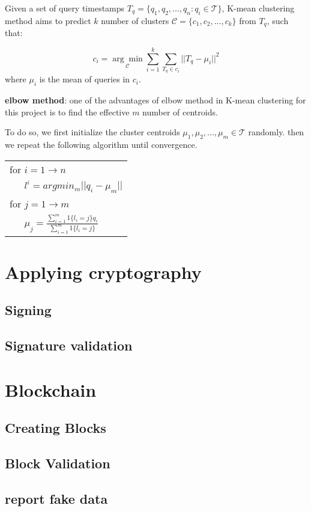  Given a set of query timestamps $T_q=\{q_1,q_2,...,q_n : q_i \in \mathcal{T}\}$, K-mean clustering method aims to predict $k$ number of clusters $\mathcal{C}=\{c_1,c_2,...,c_k\}$ from $T_q$, such that:
 
 $$c_i = \underset{\mathcal{C}}{\arg\min}\sum_{i=1}^k\sum_{T_q \in c_i} ||T_q-\mu_i||^2$$
where $\mu_i$ is the mean of queries in $c_i$.

\textbf{elbow method}: one of the advantages of elbow method in K-mean clustering for this project is to find the effective $m$ number of centroids. 

To do so, we first initialize the cluster centroids $\mu_1,\mu_2,...,\mu_m \in \mathcal{T}$ randomly.
then we repeat the following algorithm until convergence.

\vspace{1em}
{\small
	\begin{tabular}{|l|} \hline
		for $i=1 \to n$ \\
		\verb|   |$l^i= arg min_m||q_i-\mu_m|| $\\
		\verb|| for $j=1 \to m$\\
		\verb|   |$\mu_j=\frac{\sum_{i=1}^m 1\{l_i=j\}q_i}{\sum_{i=1}^m 1\{l_i=j\}}$
		
	\end{tabular}
}
\vspace{1em}

\section{Applying cryptography}
\subsection{Signing}
\subsection{Signature validation}
\section{Blockchain}
\subsection{Creating Blocks}
\subsection{Block Validation}
\subsection{report fake data}

